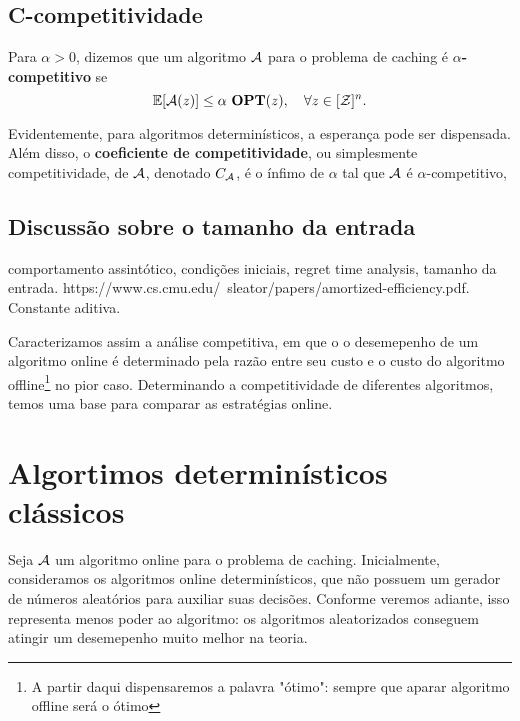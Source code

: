 \subsection{C-competitividade}

\begin{definition}
  \label{def:comp}
  Para \(\alpha > 0\), dizemos que um algoritmo \(\mathcal{A}\) para o problema de caching é \(\alpha\)\textbf{-competitivo} se
\begin{equation}
  \mathbb{E}[\mathcal{A}(z)] \le \alpha \ \textbf{OPT}(z), \quad \forall z \in [\mathcal{Z}]^n.
\end{equation}

Evidentemente, para algoritmos determinísticos, a esperança pode ser dispensada. Além disso, o \textbf{coeficiente de competitividade}, ou simplesmente competitividade, de \(\mathcal{A}\), denotado \(C_{\mathcal{A}}\), é o ínfimo de \(\alpha\) tal que \(\mathcal{A}\) é \(\alpha\)-competitivo,
\end{definition}

\subsection{Discussão sobre o tamanho da entrada}

comportamento assintótico, condições iniciais, regret time analysis, tamanho da entrada. https://www.cs.cmu.edu/~sleator/papers/amortized-efficiency.pdf. Constante aditiva.



Caracterizamos assim a análise competitiva, em que o o desemepenho de um algoritmo online é determinado pela razão entre seu custo e o custo do algoritmo offline\footnote{A partir daqui dispensaremos a palavra "ótimo": sempre que aparar algoritmo offline será o ótimo} no pior caso. Determinando a competitividade de diferentes algoritmos, temos uma base para comparar as estratégias online. 

\section{Algortimos determinísticos clássicos}

Seja \(\mathcal{A}\) um algoritmo online para o problema de caching. Inicialmente, consideramos os algoritmos online determinísticos, que não possuem um gerador de números aleatórios para auxiliar suas decisões. Conforme veremos adiante, isso representa menos poder ao algoritmo: os algoritmos aleatorizados conseguem atingir um desemepenho muito melhor na teoria. 

